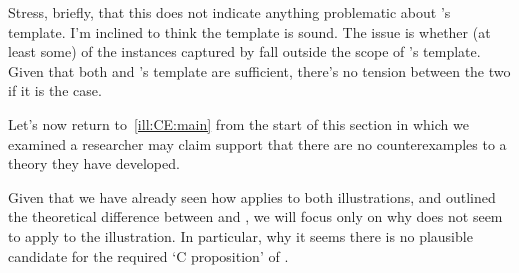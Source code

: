 \begin{note}
  Stress, briefly, that this does not indicate anything problematic about \citeauthor{Wright:2011wn}'s template.
  I'm inclined to think the template is sound.
  The issue is whether (at least some) of the instances captured by \nI{} fall outside the scope of \citeauthor{Wright:2011wn}'s template.
  Given that both \nI{} and \citeauthor{Wright:2011wn}'s template are sufficient, there's no tension between the two if it is the case.
\end{note}

\begin{note}
  Let's now return to~\autoref{ill:CE:main} from the start of this section in which we examined a researcher may claim support that there are no counterexamples to a theory they have developed.

  Given that we have already seen how \nI{} applies to both illustrations, and outlined the theoretical difference between \nI{} and \wrt{}, we will focus only on why \wrt{} does not seem to apply to the illustration.
  In particular, why it seems there is no plausible candidate for the required `C proposition' of \wrt{}.
\end{note}

